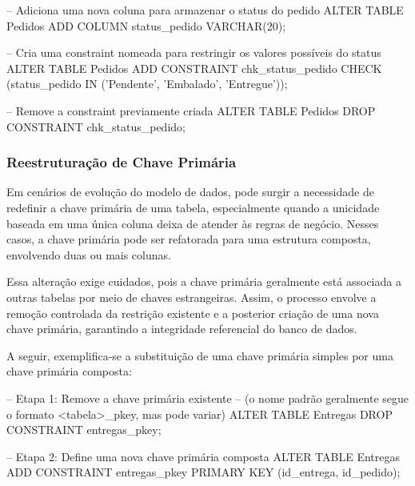 \begin{sqlcode}
    -- Adiciona uma nova coluna para armazenar o status do pedido
    ALTER TABLE Pedidos 
    ADD COLUMN status_pedido VARCHAR(20);

    -- Cria uma constraint nomeada para restringir os valores possíveis do status
    ALTER TABLE Pedidos 
    ADD CONSTRAINT chk_status_pedido 
    CHECK (status_pedido IN ('Pendente', 'Embalado', 'Entregue'));

    -- Remove a constraint previamente criada
    ALTER TABLE Pedidos 
    DROP CONSTRAINT chk_status_pedido;
\end{sqlcode}

\subsubsection{Reestruturação de Chave Primária}

Em cenários de evolução do modelo de dados, pode surgir a necessidade de redefinir a chave primária de uma tabela, especialmente quando a unicidade baseada em uma única coluna deixa de atender às regras de negócio. Nesses casos, a chave primária pode ser refatorada para uma estrutura composta, envolvendo duas ou mais colunas.

Essa alteração exige cuidados, pois a chave primária geralmente está associada a outras tabelas por meio de chaves estrangeiras. Assim, o processo envolve a remoção controlada da restrição existente e a posterior criação de uma nova chave primária, garantindo a integridade referencial do banco de dados.

A seguir, exemplifica-se a substituição de uma chave primária simples por uma chave primária composta:

\begin{sqlcode}
-- Etapa 1: Remove a chave primária existente
-- (o nome padrão geralmente segue o formato <tabela>_pkey, mas pode variar)
ALTER TABLE Entregas 
DROP CONSTRAINT entregas_pkey;

-- Etapa 2: Define uma nova chave primária composta
ALTER TABLE Entregas 
ADD CONSTRAINT entregas_pkey 
PRIMARY KEY (id_entrega, id_pedido);
\end{sqlcode}
